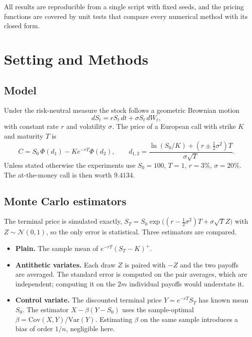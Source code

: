 \documentclass[11pt,a4paper,oneside]{report}
\begin{document}
All results are reproducible from a single script with fixed seeds, and the pricing functions are covered by unit tests that compare every numerical method with its closed form.

\tableofcontents

\chapter{Setting and Methods}

\section{Model}
Under the risk-neutral measure the stock follows a geometric Brownian motion
\begin{equation}
dS_t = r S_t\,dt + \sigma S_t\,dW_t ,
\end{equation}
with constant rate $r$ and volatility $\sigma$. The price of a European call with strike $K$ and maturity $T$ is
\begin{equation}
C = S_0\,\Phi(d_1) - K e^{-rT}\Phi(d_2),\qquad d_{1,2} = \frac{\ln(S_0/K) + (r\pm\tfrac12\sigma^2)T}{\sigma\sqrt T}.
\end{equation}
Unless stated otherwise the experiments use $S_0=100$, $T=1$, $r=3\%$, $\sigma=20\%$. The at-the-money call is then worth $9.4134$.

\section{Monte Carlo estimators}
The terminal price is simulated exactly, $S_T = S_0\exp\big((r-\tfrac12\sigma^2)T + \sigma\sqrt T Z\big)$ with $Z\sim\mathcal N(0,1)$, so the only error is statistical. Three estimators are compared.

\begin{itemize}[leftmargin=1.5em]
\item \textbf{Plain.} The sample mean of $e^{-rT}(S_T-K)^+$.
\item \textbf{Antithetic variates.} Each draw $Z$ is paired with $-Z$ and the two payoffs are averaged. The standard error is computed on the pair averages, which are independent; computing it on the $2m$ individual payoffs would understate it.
\item \textbf{Control variate.} The discounted terminal price $Y=e^{-rT}S_T$ has known mean $S_0$. The estimator $X-\beta(Y-S_0)$ uses the sample-optimal $\beta=\mathrm{Cov}(X,Y)/\mathrm{Var}(Y)$. Estimating $\beta$ on the same sample introduces a bias of order $1/n$, negligible here.
\end{itemize}
\end{document}
